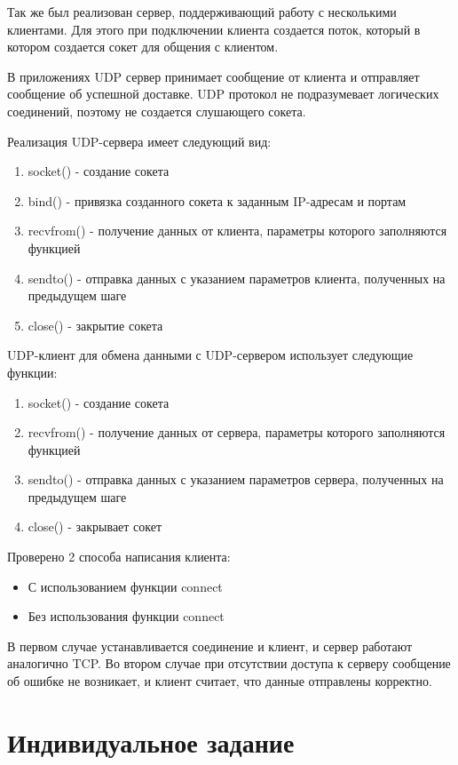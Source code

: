 	Так же был реализован сервер, поддерживающий работу с несколькими клиентами.
Для этого при подключении клиента создается поток, который в котором создается сокет для общения с клиентом.
	
	В приложениях UDP сервер принимает сообщение от клиента и отправляет сообщение об успешной доставке. UDP протокол не подразумевает логических соединений, поэтому не создается слушающего сокета.

Реализация UDP-сервера имеет следующий вид:
\begin{enumerate}
\item socket() - создание сокета
\item bind() - привязка созданного сокета к заданным IP-адресам и портам
\item recvfrom() - получение данных от клиента, параметры которого заполняются функцией
\item sendto() - отправка данных с указанием параметров клиента, полученных на предыдущем шаге
\item close() - закрытие сокета
\end{enumerate}


UDP-клиент для обмена данными с UDP-сервером использует следующие функции:
\begin{enumerate}
\item socket() - создание сокета
\item recvfrom() - получение данных от сервера, параметры которого заполняются функцией
\item sendto() - отправка данных с указанием параметров сервера, полученных на предыдущем шаге
\item close() - закрывает сокет
\end{enumerate}


Проверено 2 способа написания клиента:
\begin{itemize}
\item С использованием функции connect
\item Без использования функции connect
\end{itemize}
В первом случае устанавливается соединение и клиент, и сервер работают аналогично TCP. Во втором случае при отсутствии доступа к серверу сообщение об ошибке не возникает, и клиент считает, что данные отправлены корректно.


\section{Индивидуальное задание}


